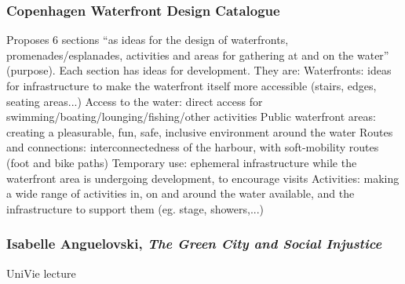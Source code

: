\documentclass{article}
\begin{document}
\subsubsection{Copenhagen Waterfront Design Catalogue}

\parencite{copenhagenwaterfront}

\begin{outline}
	\1 Proposes 6 sections ``as ideas for the design of waterfronts, promenades/esplanades, activities and areas for gathering at and on the water'' (purpose). Each section has ideas for development. They are:
		\2 Waterfronts: ideas for infrastructure to make the waterfront itself more accessible (stairs, edges, seating areas...)
		\2 Access to the water: direct access for swimming/boating/lounging/fishing/other activities
		\2 Public waterfront areas: creating a pleasurable, fun, safe, inclusive environment around the water
		\2 Routes and connections: interconnectedness of the harbour, with soft-mobility routes (foot and bike paths)
		\2 Temporary use: ephemeral infrastructure while the waterfront area is undergoing development, to encourage visits
		\2 Activities: making a wide range of activities in, on and around the water available, and the infrastructure to support them (eg. stage, showers,...)
\end{outline}

\subsubsection{Isabelle Anguelovski, \textit{The Green City and Social Injustice}}

UniVie lecture
\end{document}
